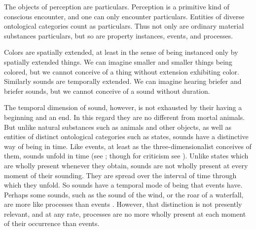 The objects of perception are particulars. Perception is a primitive kind of conscious encounter, and one can only encounter particulars. Entities of diverse ontological categories count as particulars. Thus not only are ordinary material substances particulars, but so are property instances, events, and processes.

Colors are spatially extended, at least in the sense of being instanced only by spatially extended things. We can imagine smaller and smaller things being colored, but we cannot conceive of a thing without extension exhibiting color. Similarly sounds are temporally extended. We can imagine hearing briefer and briefer sounds, but we cannot conceive of a sound without duration. 

The temporal dimension of sound, however, is not exhausted by their having a beginning and an end. In this regard they are no different from mortal animals. But unlike natural substances such as animals and other objects, as well as entities of distinct ontological categories such as states, sounds have a distinctive way of being in time. Like events, at least as the three-dimensionalist conceives of them, sounds unfold in time (see \citealt{Fine:2006fk}; though for criticism see \citealt{Sider:1997fk,Hawthorne:2008uq}). Unlike states which are wholly present whenever they obtain, sounds are not wholly present at every moment of their sounding. They are spread over the interval of time through which they unfold. So sounds have a temporal mode of being that events have. Perhaps some sounds, such as the sound of the wind, or the roar of a waterfall, are more like processes than events \citep[4]{Broad:1952kx}. However, that distinction is not presently relevant, and at any rate, processes are no more wholly present at each moment of their occurrence than events. 

